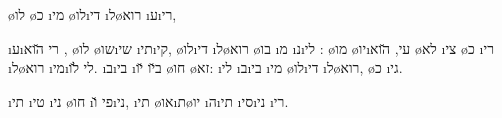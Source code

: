 \o{לו} \o{כ} \i{מי} \o{לו}\i{די} \i{ל}\o{רוא} \i{ע}\i{רי},

 \i{ע}\i{רי} \u{הוא}  ,  \o{לו} \o{שו}\i{שי} \i{תי}\i{קי},  \o{לו}\i{די} \i{ל}\o{רוא} \o{בו} \i{מ} \i{נ}\i{לי} : \o{מו}    \o{יו}\i{עי}, \u{הוא} \o{לא} \i{צי}  \o{כ}  \i{רי}  \i{ל}\o{רוא}  \i{מי}\i{לי} \u{לו}. \i{ב}\i{בי}  \i{ב}\u{יו} \u{יו} \o{חו} \o{זא}: \i{לי}    \i{ב}\i{בי} \i{מי} \o{לו}\i{די} \i{ל}\o{רוא}, \o{כ} \i{גי}.

\i{תי}  \i{טי} \i{ני} \o{חו}  \i{פי} \u{ו}\i{ני}, \i{תי}  \o{או}\i{ת}\o{יו} \i{ה}\i{תי} \i{סי}\i{ני} \i{רי}.

